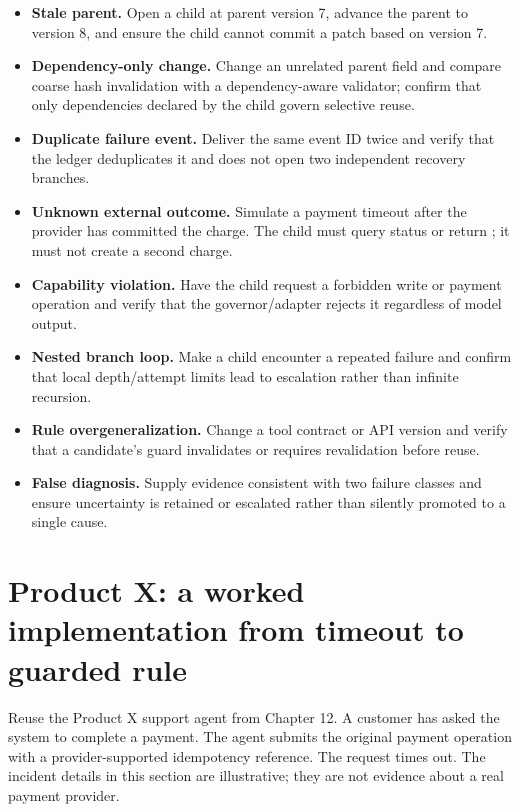 \begin{itemize}
  \item \textbf{Stale parent.} Open a child at parent version 7, advance the parent to version 8, and ensure the child cannot commit a patch based on version 7.
  \item \textbf{Dependency-only change.} Change an unrelated parent field and compare coarse hash invalidation with a dependency-aware validator; confirm that only dependencies declared by the child govern selective reuse.
  \item \textbf{Duplicate failure event.} Deliver the same event ID twice and verify that the ledger deduplicates it and does not open two independent recovery branches.
  \item \textbf{Unknown external outcome.} Simulate a payment timeout after the provider has committed the charge. The child must query status or return ; it must not create a second charge.
  \item \textbf{Capability violation.} Have the child request a forbidden write or payment operation and verify that the governor/adapter rejects it regardless of model output.
  \item \textbf{Nested branch loop.} Make a child encounter a repeated failure and confirm that local depth/attempt limits lead to escalation rather than infinite recursion.
  \item \textbf{Rule overgeneralization.} Change a tool contract or API version and verify that a candidate's guard invalidates or requires revalidation before reuse.
  \item \textbf{False diagnosis.} Supply evidence consistent with two failure classes and ensure uncertainty is retained or escalated rather than silently promoted to a single cause.
\end{itemize}

\section{Product X: a worked implementation from timeout to guarded rule}
\label{sec:ch13-productx}

\BookExampleLabel{} Reuse the Product X support agent from Chapter 12. A customer has asked the system to complete a payment. The agent submits the original payment operation with a provider-supported idempotency reference. The request times out. The incident details in this section are illustrative; they are not evidence about a real payment provider.

